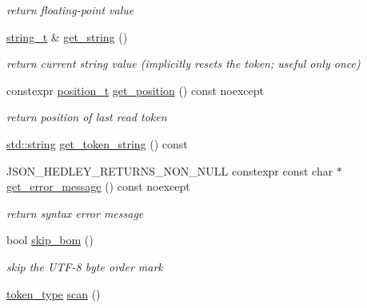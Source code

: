 \begin{DoxyCompactItemize}
\begin{DoxyCompactList}\small\item\em return floating-\/point value \end{DoxyCompactList}\item 
\hyperlink{classnlohmann_1_1detail_1_1lexer_ab63d35c658887592a4b09ad26eb4c795}{string\+\_\+t} \& \hyperlink{classnlohmann_1_1detail_1_1lexer_a54aa290ff2f60218a8f35f1ebf81666d}{get\+\_\+string} ()
\begin{DoxyCompactList}\small\item\em return current string value (implicitly resets the token; useful only once) \end{DoxyCompactList}\item 
constexpr \hyperlink{structnlohmann_1_1detail_1_1position__t}{position\+\_\+t} \hyperlink{classnlohmann_1_1detail_1_1lexer_abf5143501435f9f79898c1ff238c2622}{get\+\_\+position} () const noexcept
\begin{DoxyCompactList}\small\item\em return position of last read token \end{DoxyCompactList}\item 
\hyperlink{namespacenlohmann_1_1detail_a1ed8fc6239da25abcaf681d30ace4985ab45cffe084dd3d20d928bee85e7b0f21}{std\+::string} \hyperlink{classnlohmann_1_1detail_1_1lexer_a6d8a58be845717a86726756372414cbb}{get\+\_\+token\+\_\+string} () const 
\item 
J\+S\+O\+N\+\_\+\+H\+E\+D\+L\+E\+Y\+\_\+\+R\+E\+T\+U\+R\+N\+S\+\_\+\+N\+O\+N\+\_\+\+N\+U\+LL constexpr const char $\ast$ \hyperlink{classnlohmann_1_1detail_1_1lexer_a3cead908f797ffa091bb67e90985739d}{get\+\_\+error\+\_\+message} () const noexcept
\begin{DoxyCompactList}\small\item\em return syntax error message \end{DoxyCompactList}\item 
bool \hyperlink{classnlohmann_1_1detail_1_1lexer_a709afd52def2e258dac0b8a67dc4ea26}{skip\+\_\+bom} ()
\begin{DoxyCompactList}\small\item\em skip the U\+T\+F-\/8 byte order mark \end{DoxyCompactList}\item 
\hyperlink{classnlohmann_1_1detail_1_1lexer_a3f313cdbe187cababfc5e06f0b69b098}{token\+\_\+type} \hyperlink{classnlohmann_1_1detail_1_1lexer_aac3041cd2b9291e64fee38db422863c9}{scan} ()
\end{DoxyCompactItemize}
